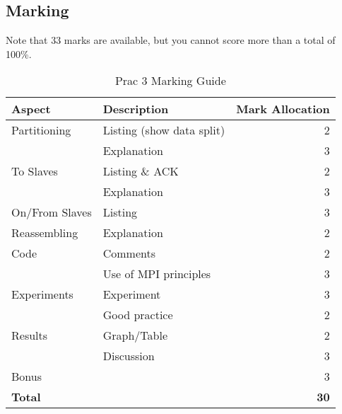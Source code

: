 \subsection{Marking}
Note that 33 marks are available, but you cannot score more than a total of 100\%.
\begin{table}[H]
\centering
\caption{Prac 3 Marking Guide}
\label{tbl:Prac3Marks}
\begin{tabular}{|l|l|r|}
\hline
\textbf{Aspect} & \textbf{Description} & \multicolumn{1}{l|}{\textbf{Mark Allocation}} \\ \hline
Partitioning & Listing (show data split) & 2 \\ \hline
 & Explanation & 3 \\ \hline
To Slaves & Listing \& ACK & 2 \\ \hline
 & Explanation & 3 \\ \hline
On/From Slaves & Listing & 3 \\ \hline
Reassembling & Explanation & 2 \\ \hline
Code & Comments & 2 \\ \hline
 & Use of MPI principles & 3 \\ \hline
Experiments & Experiment & 3 \\ \hline
 & Good practice & 2 \\ \hline
Results & Graph/Table & 2 \\ \hline
 & Discussion & 3 \\ \hline
Bonus &  & 3 \\ \hline
\textbf{Total} &  & \textbf{30} \\ \hline
\end{tabular}
\end{table}